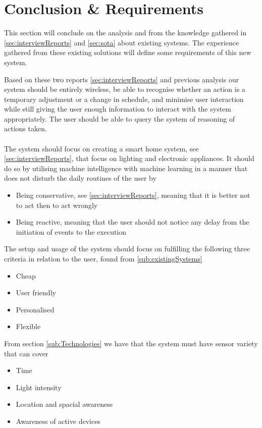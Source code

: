\section{Conclusion \& Requirements}\label{sec:requirements}
This section will conclude on the analysis and from the knowledge gathered in \cref{sec:interviewReports} and \cref{sec:sota} about existing systems. The experience gathered from these existing solutions will define some requirements of this new system.

Based on these two reports \cref{sec:interviewReports} and previous analysis our system should be entirely wireless, be able to recognise whether an action is a temporary adjustment or a change in schedule, and minimise user interaction while still giving the user enough information to interact with the system appropriately. The user should be able to query the system of reasoning of actions taken.
\\\\
The system should focus on creating a smart home system, see \cref{sec:interviewReports}, that focus on lighting and electronic appliances. It should do so by utilising machine intelligence with machine learning in a manner that does not disturb the daily routines of the user by
\begin{itemize}
  \item Being conservative, see \cref{sec:interviewReports}, meaning that it is better not to act then to act wrongly
  \item Being reactive, meaning that the user should not notice any delay from the initiation of events to the execution
\end{itemize}
The setup and usage of the system should focus on fulfilling the following three criteria in relation to the user, found from \cref{sub:existingSystems}
\begin{itemize}
  \item Cheap
  \item User friendly
  \item Personalised
  \item Flexible
\end{itemize}
From section \cref{sub:Technologies} we have that the system must have sensor variety that can cover
\begin{itemize}
  \item Time
  \item Light intensity
  \item Location and spacial awareness
  \item Awareness of active devices
\end{itemize}
